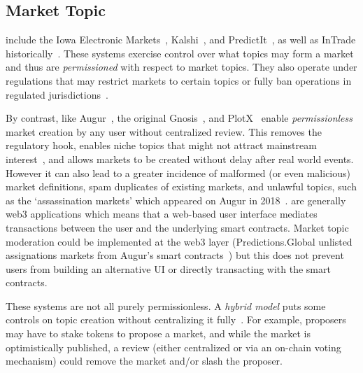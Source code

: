 


\subsection{Market Topic}\label{wf:topic}



\cepms include the Iowa Electronic Markets~\cite{iem}, Kalshi~\cite{kalshi_docs}, and PredictIt~\cite{predictit_faq}, as well as InTrade historically~\cite{intrade}. These systems exercise control over what topics may form a market and thus are \textit{permissioned} with respect to market topics. They also operate under regulations that may restrict markets to certain topics or fully ban operations in regulated jurisdictions~\cite{Du19,Ma24}. 

By contrast, \depms like Augur~\cite{AKPWZ15,AKPWZ19}, the original Gnosis~\cite{Gn17}, and PlotX~\cite{plotx_docs} enable \textit{permissionless} market creation by any user without centralized review. This removes the regulatory hook, enables niche topics that might not attract mainstream interest~\cite{WZ24}, and allows markets to be created without delay after real world events. However it can also lead to a greater incidence of malformed (or even malicious) market definitions, spam duplicates of existing markets, and unlawful topics, such as the `assassination markets' which appeared on Augur in 2018~\cite{Du19}. \depms are generally web3 applications which means that a web-based user interface mediates transactions between the user and the underlying smart contracts. Market topic moderation could be implemented at the web3 layer (\eg Predictions.Global unlisted assignations markets from Augur's smart contracts~\cite{Du19}) but this does not prevent users from building an alternative UI or directly transacting with the smart contracts. 


These systems are not all purely permissionless. A \textit{hybrid model} puts some controls on topic creation without centralizing it fully~\cite{AKPWZ19}. For example, proposers may have to stake tokens to propose a market, and while the market is optimistically published, a review (either centralized or via an on-chain voting mechanism) could remove the market and/or slash the proposer.  

